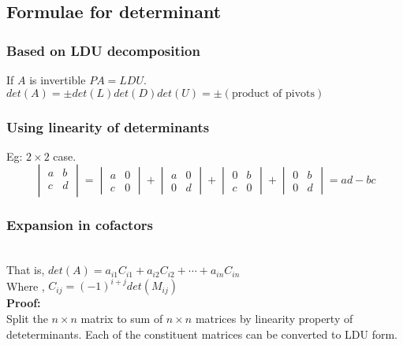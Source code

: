 \subsection{Formulae for determinant}

\subsubsection{Based on LDU decomposition}
If $A$ is invertible $PA = LDU$.\\
$det(A) = \pm det(L)det(D)det(U) = \pm(\text{product of pivots})$\\

\subsubsection{Using linearity of determinants}
Eg: $2\times 2$ case.\\
$$
\begin{vmatrix}
a & b\\
c & d\\
\end{vmatrix}
= 
\begin{vmatrix}
a & 0\\
c & 0
\end{vmatrix}
+
\begin{vmatrix}
a & 0\\
0 & d
\end{vmatrix}
+
\begin{vmatrix}
0 & b\\
c & 0
\end{vmatrix}
+
\begin{vmatrix}
0 & b\\
0 & d
\end{vmatrix}
= ad - bc
$$

\subsubsection{Expansion in cofactors}

\\
That is, $det(A) = a_{i1}C_{i1} + a_{i2}C_{i2} + \cdots + a_{in}C_{in}$\\
Where , $C_{ij} = (-1)^{i+j}det(M_{ij})$\\
\textbf{Proof:}\\
Split the $n\times n$ matrix to sum of $n\times n$ matrices by linearity property of deteterminants. Each of the constituent matrices can be converted to LDU form.  

